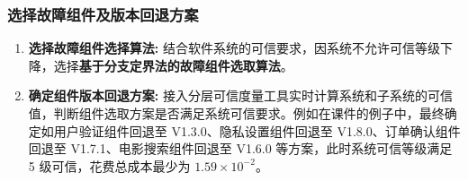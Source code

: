 \documentclass{article}
\begin{document}
\subsubsection{选择故障组件及版本回退方案}

\begin{enumerate}
	\item 
	\textbf{选择故障组件选择算法:} 结合软件系统的可信要求，因系统不允许可信等级下降，选择\textbf{基于分支定界法的故障组件选取算法}。
	
	\item 
	\textbf{确定组件版本回退方案:} 接入分层可信度量工具实时计算系统和子系统的可信值，判断组件选取方案是否满足系统可信要求。例如在课件的例子中，最终确定如用户验证组件回退至 V1.3.0、隐私设置组件回退至 V1.8.0、订单确认组件回退至 V1.7.1、电影搜索组件回退至 V1.6.0 等方案，此时系统可信等级满足 5 级可信，花费总成本最少为 $1.59\times10^{-2}$。
\end{enumerate}
\end{document}

